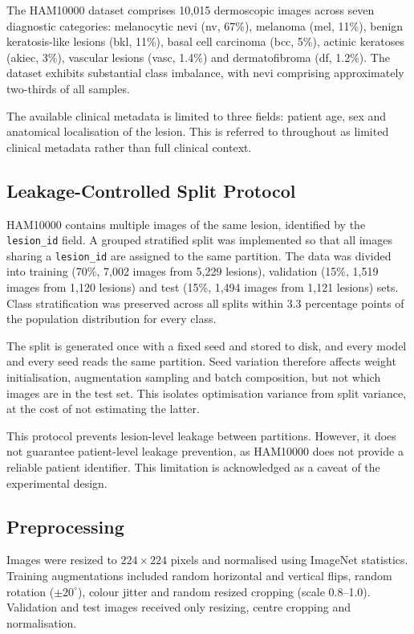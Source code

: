 \documentclass[conference]{IEEEtran}
\begin{document}
The HAM10000 dataset \citep{tschandl2018ham10000} comprises 10,015 dermoscopic images across seven diagnostic categories: melanocytic nevi (nv, 67\%), melanoma (mel, 11\%), benign keratosis-like lesions (bkl, 11\%), basal cell carcinoma (bcc, 5\%), actinic keratoses (akiec, 3\%), vascular lesions (vasc, 1.4\%) and dermatofibroma (df, 1.2\%). The dataset exhibits substantial class imbalance, with nevi comprising approximately two-thirds of all samples.

The available clinical metadata is limited to three fields: patient age, sex and anatomical localisation of the lesion. This is referred to throughout as limited clinical metadata rather than full clinical context.

\subsection{Leakage-Controlled Split Protocol}

HAM10000 contains multiple images of the same lesion, identified by the \texttt{lesion\_id} field. A grouped stratified split was implemented so that all images sharing a \texttt{lesion\_id} are assigned to the same partition. The data was divided into training (70\%, 7,002 images from 5,229 lesions), validation (15\%, 1,519 images from 1,120 lesions) and test (15\%, 1,494 images from 1,121 lesions) sets. Class stratification was preserved across all splits within 3.3 percentage points of the population distribution for every class.

The split is generated once with a fixed seed and stored to disk, and every model and every seed reads the same partition. Seed variation therefore affects weight initialisation, augmentation sampling and batch composition, but not which images are in the test set. This isolates optimisation variance from split variance, at the cost of not estimating the latter.

This protocol prevents lesion-level leakage between partitions. However, it does not guarantee patient-level leakage prevention, as HAM10000 does not provide a reliable patient identifier. This limitation is acknowledged as a caveat of the experimental design.

\subsection{Preprocessing}

Images were resized to $224 \times 224$ pixels and normalised using ImageNet statistics. Training augmentations included random horizontal and vertical flips, random rotation ($\pm 20^{\circ}$), colour jitter and random resized cropping (scale 0.8--1.0). Validation and test images received only resizing, centre cropping and normalisation.
\end{document}
